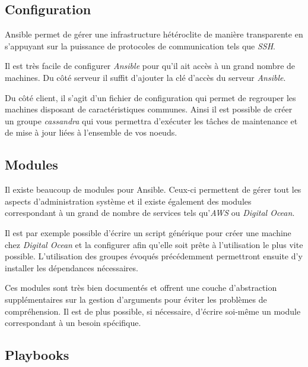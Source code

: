 \documentclass[12pt,a4paper]{article}
\begin{document}
  \newpage

  \subsection{Configuration}\label{configuration}

  Ansible permet de gérer une infrastructure hétéroclite de manière
  transparente en s'appuyant sur la puissance de protocoles de
  communication tels que \emph{SSH}.

  \bigskip

  Il est très facile de configurer \emph{Ansible} pour qu'il ait accès à
  un grand nombre de machines. Du côté serveur il suffit d'ajouter la clé
  d'accès du serveur \emph{Ansible}.

  \bigskip

  Du côté client, il s'agit d'un fichier de configuration qui permet de
  regrouper les machines disposant de caractéristiques communes. Ainsi il
  est possible de créer un groupe \emph{cassandra} qui vous permettra
  d'exécuter les tâches de maintenance et de mise à jour liées à
  l'ensemble de vos noeuds.

  \newpage

  \subsection{Modules}\label{modules}

  Il existe beaucoup de modules pour Ansible. Ceux-ci permettent de gérer
  tout les aspects d'administration système et il existe également des
  modules correspondant à un grand de nombre de services tels
  qu'\emph{AWS} ou \emph{Digital Ocean}.

  \bigskip

  Il est par exemple possible d'écrire un script générique pour créer une
  machine chez \emph{Digital Ocean} et la configurer afin qu'elle soit
  prête à l'utilisation le plus vite possible. L'utilisation des groupes
  évoqués précédemment permettront ensuite d'y installer les dépendances
  nécessaires.

  \bigskip

  Ces modules sont très bien documentés et offrent une couche
  d'abstraction supplémentaires sur la gestion d'arguments pour éviter les
  problèmes de compréhension. Il est de plus possible, si nécessaire,
  d'écrire soi-même un module correspondant à un besoin spécifique.

  \newpage

  \subsection{Playbooks}\label{playbooks}
\end{document}
